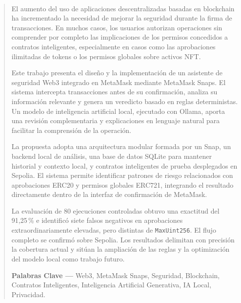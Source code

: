 \newpage

\vspace{50pt}

{
    \paragraph{} %
    \begin{abstract}

        El aumento del uso de aplicaciones descentralizadas basadas en blockchain ha incrementado la necesidad de mejorar la seguridad durante la firma de transacciones. En muchos casos, los usuarios autorizan operaciones sin comprender por completo las implicaciones de los permisos concedidos a contratos inteligentes, especialmente en casos como las aprobaciones ilimitadas de tokens o los permisos globales sobre activos NFT.

        Este trabajo presenta el diseño y la implementación de un asistente de seguridad Web3 integrado en MetaMask mediante MetaMask Snaps. El sistema intercepta transacciones antes de su confirmación, analiza su información relevante y genera un veredicto basado en reglas deterministas. Un modelo de inteligencia artificial local, ejecutado con Ollama, aporta una revisión complementaria y explicaciones en lenguaje natural para facilitar la comprensión de la operación.
        
        La propuesta adopta una arquitectura modular formada por un Snap, un backend local de análisis, una base de datos SQLite para mantener historial y contexto local, y contratos inteligentes de prueba desplegados en Sepolia. El sistema permite identificar patrones de riesgo relacionados con aprobaciones ERC20 y permisos globales ERC721, integrando el resultado directamente dentro de la interfaz de confirmación de MetaMask.

        La evaluación de 80 ejecuciones controladas obtuvo una exactitud del 91,25\,\% e identificó siete falsos negativos en aprobaciones extraordinariamente elevadas, pero distintas de \texttt{MaxUint256}. El flujo completo se confirmó sobre Sepolia. Los resultados delimitan con precisión la cobertura actual y sitúan la ampliación de las reglas y la optimización del modelo local como trabajo futuro.


        \vspace{30pt}

        \textbf{Palabras Clave — } Web3, MetaMask Snaps, Seguridad, Blockchain, Contratos Inteligentes, Inteligencia Artificial Generativa, IA Local, Privacidad.

        
    \end{abstract}
}

